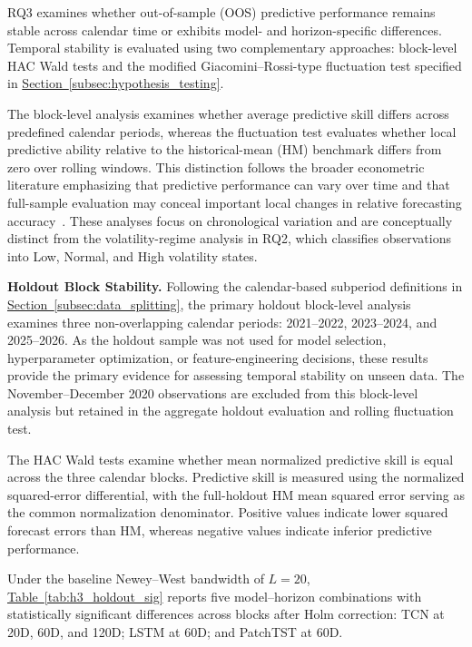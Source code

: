 \documentclass[runningheads,orivec]{llncs}
\begin{document}
RQ3 examines whether out-of-sample (OOS) predictive performance remains stable across calendar time or exhibits model- and horizon-specific differences. Temporal stability is evaluated using two complementary approaches: block-level HAC Wald tests and the modified Giacomini--Rossi-type fluctuation test specified in \hyperref[subsec:hypothesis_testing]{Section~\ref*{subsec:hypothesis_testing}}.

The block-level analysis examines whether average predictive skill differs across predefined calendar periods, whereas the fluctuation test evaluates whether local predictive ability relative to the historical-mean (HM) benchmark differs from zero over rolling windows. This distinction follows the broader econometric literature emphasizing that predictive performance can vary over time and that full-sample evaluation may conceal important local changes in relative forecasting accuracy~\cite{giacomini2010}. These analyses focus on chronological variation and are conceptually distinct from the volatility-regime analysis in RQ2, which classifies observations into Low, Normal, and High volatility states.

\medskip
\noindent\textbf{Holdout Block Stability.}
Following the calendar-based subperiod definitions in \hyperref[subsec:data_splitting]{Section~\ref*{subsec:data_splitting}}, the primary holdout block-level analysis examines three non-overlapping calendar periods: 2021--2022, 2023--2024, and 2025--2026. As the holdout sample was not used for model selection, hyperparameter optimization, or feature-engineering decisions, these results provide the primary evidence for assessing temporal stability on unseen data. The November--December 2020 observations are excluded from this block-level analysis but retained in the aggregate holdout evaluation and rolling fluctuation test.

The HAC Wald tests examine whether mean normalized predictive skill is equal across the three calendar blocks. Predictive skill is measured using the normalized squared-error differential, with the full-holdout HM mean squared error serving as the common normalization denominator. Positive values indicate lower squared forecast errors than HM, whereas negative values indicate inferior predictive performance.

Under the baseline Newey--West bandwidth of $L=20$, \hyperref[tab:h3_holdout_sig]{Table~\ref*{tab:h3_holdout_sig}} reports five model--horizon combinations with statistically significant differences across blocks after Holm correction: TCN at 20D, 60D, and 120D; LSTM at 60D; and PatchTST at 60D.
\end{document}
